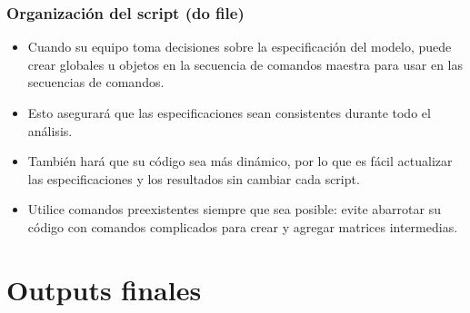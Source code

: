\documentclass[10pt, aspectratio=169, compress]{beamer}
\begin{document}
\begin{frame}
	\frametitle{Organización del script (do file)}
	\begin{itemize}[<+->]
		\item Cuando su equipo toma decisiones sobre la especificación del modelo, puede crear globales u objetos en la secuencia de comandos maestra para usar en las secuencias de comandos.
		\item Esto asegurará que las especificaciones sean consistentes durante todo el análisis.
		\item También hará que su código sea más dinámico, por lo que es fácil actualizar las especificaciones y los resultados sin cambiar cada script.
		\item Utilice comandos preexistentes siempre que sea posible: evite abarrotar su código con comandos complicados para crear y agregar matrices intermedias.
	\end{itemize}
\end{frame}
\section{Outputs finales}
\end{document}

